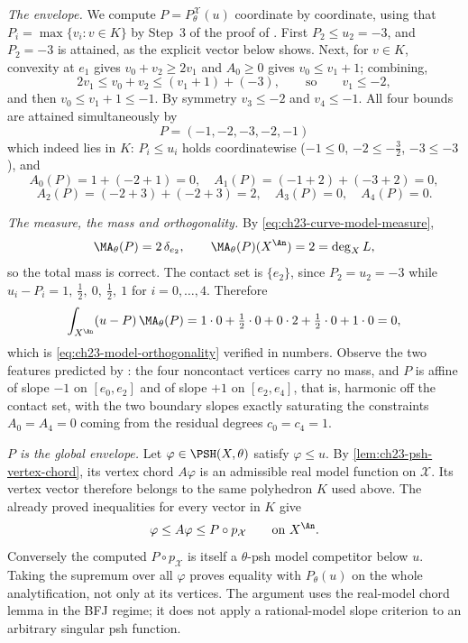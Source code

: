 \begin{example}
\emph{The envelope.}  We compute \(P=P^{\mathcal X}_\theta(u)\) coordinate
by coordinate, using that \(P_i=\max\{v_i:v\in K\}\) by Step~3 of the proof
of .  First \(P_2\leq u_2=-3\), and
\(P_2=-3\) is attained, as the explicit vector below shows.  Next, for
\(v\in K\), convexity at \(e_1\) gives \(v_0+v_2\geq2v_1\) and \(A_0\geq0\)
gives \(v_0\leq v_1+1\); combining,
\[
 2v_1\leq v_0+v_2\leq (v_1+1)+(-3),
 \qquad\text{so}\qquad v_1\leq-2 ,
\]
and then \(v_0\leq v_1+1\leq-1\).  By symmetry \(v_3\leq-2\) and
\(v_4\leq-1\).  All four bounds are attained simultaneously by
\[
 \boxed{\ P=(-1,-2,-3,-2,-1)\ }
\]
which indeed lies in \(K\): \(P_i\leq u_i\) holds coordinatewise
(\(-1\leq0\), \(-2\leq-\tfrac32\), \(-3\leq-3\)), and
\[
 A_0(P)=1+(-2+1)=0,\quad
 A_1(P)=(-1+2)+(-3+2)=0,
\]
\[
 A_2(P)=(-2+3)+(-2+3)=2,\quad
 A_3(P)=0,\quad
 A_4(P)=0 .
\]

\emph{The measure, the mass and orthogonality.}  By
\eqref{eq:ch23-curve-model-measure},
\[
 \MA_\theta(P)=2\,\delta_{e_2},
 \qquad
 \MA_\theta(P)(X^{\An})=2=\deg_XL ,
\]
so the total mass is correct.  The contact set is \(\{e_2\}\), since
\(P_2=u_2=-3\) while \(u_i-P_i=1,\ \tfrac12,\ 0,\ \tfrac12,\ 1\) for
\(i=0,\ldots,4\).  Therefore
\[
 \int_{X^{\An}}(u-P)\,\MA_\theta(P)
 =1\cdot0+\tfrac12\cdot0+0\cdot2+\tfrac12\cdot0+1\cdot0=0 ,
\]
which is \eqref{eq:ch23-model-orthogonality} verified in numbers.  Observe
the two features predicted by
: the four noncontact vertices
carry no mass, and \(P\) is affine of slope \(-1\) on \([e_0,e_2]\) and of
slope \(+1\) on \([e_2,e_4]\), that is, harmonic off the contact set, with
the two boundary slopes exactly saturating the constraints
\(A_0=A_4=0\) coming from the residual degrees \(c_0=c_4=1\).

\emph{\(P\) is the global envelope.}
Let \(\varphi\in\PSH(X,\theta)\) satisfy \(\varphi\leq u\).
By \cref{lem:ch23-psh-vertex-chord}, its vertex chord
\(A\varphi\) is an admissible real model function on
\(\mathcal X\).  Its vertex vector therefore belongs to the same
polyhedron \(K\) used above.  The already proved inequalities for
every vector in \(K\) give
\[
            \varphi\leq A\varphi\leq P\circ p_{\mathcal X}
            \qquad\text{on }X^{\An}.
\]
Conversely the computed \(P\circ p_{\mathcal X}\) is itself a
\(\theta\)-psh model competitor below \(u\).  Taking the supremum
over all \(\varphi\) proves equality with \(P_\theta(u)\) on the
whole analytification, not only at its vertices.  The argument uses
the real-model chord lemma in the BFJ regime; it does not apply a
rational-model slope criterion to an arbitrary singular psh function.


\end{example}

